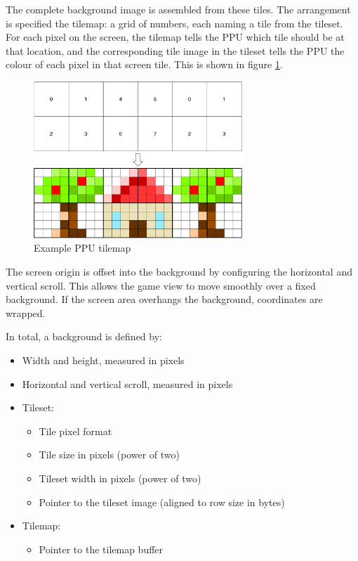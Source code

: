 The complete background image is assembled from these tiles. The arrangement is specified the tilemap: a grid of numbers, each naming a tile from the tileset. For each pixel on the screen, the tilemap tells the PPU which tile should be at that location, and the corresponding tile image in the tileset tells the PPU the colour of each pixel in that screen tile. This is shown in figure \ref{diagram:ppu_tilemap}.

\begin{figure}[H]
\centering
\caption{Example PPU tilemap}
\label{diagram:ppu_tilemap}
\includegraphics[width=0.7\textwidth]{diagrams/ppu_tilemap.pdf}
\end{figure}

The screen origin is offset into the background by configuring the horizontal and vertical scroll. This allows the game view to move smoothly over a fixed background. If the screen area overhangs the background, coordinates are wrapped.

In total, a background is defined by:

\begin{itemize}
	\item Width and height, measured in pixels
	\item Horizontal and vertical scroll, measured in pixels
	\item Tileset:
	\begin{itemize}
		\item Tile pixel format
		\item Tile size in pixels (power of two)
		\item Tileset width in pixels (power of two)
		\item Pointer to the tileset image (aligned to row size in bytes)
	\end{itemize}
	\item Tilemap:
	\begin{itemize}
		\item Pointer to the tilemap buffer
	\end{itemize}
\end{itemize}

